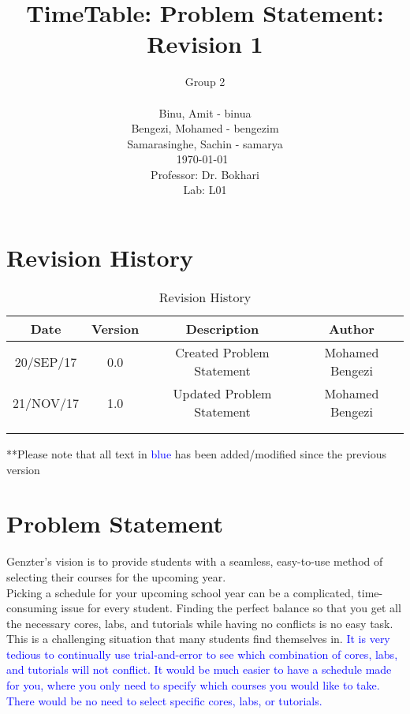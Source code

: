 \documentclass[12pt]{article}
\title{TimeTable: Problem Statement: Revision 1}
\author{Group 2 \\
		\\ Binu, Amit - binua
		\\ Bengezi, Mohamed - bengezim
		\\ Samarasinghe, Sachin - samarya
		\\ \today\
		\\Professor: Dr. Bokhari
		\\ Lab: L01}
\date{}
\begin{document}
\maketitle
\newpage
\tableofcontents

\newpage

\section{Revision History}
\begin{table}[h]
\begin{center}
\begin{tabular}{ | c | c | c | c | }
\hline
 Date & Version & Description & Author \\ 
\hline
 20/SEP/17 & 0.0 & Created Problem Statement & Mohamed Bengezi \\  
\hline
 21/NOV/17 & 1.0 & Updated Problem Statement & Mohamed Bengezi \\
\hline
 & & & \\
\hline 
 & & & \\ 
\hline 
\end{tabular}
\end{center}
\caption{Revision History}
\end{table}

**Please note that all text in  \textcolor{blue}{blue} has been added/modified since the previous version

\newpage
\section{Problem Statement}
Genzter’s vision is to provide students with a seamless, easy-to-use method of selecting their courses for the upcoming year.\\
 
Picking a schedule for your upcoming school year can be a complicated, time-consuming issue for every student. Finding the perfect balance so that you get all the necessary cores, labs, and tutorials while having no conflicts is no easy task. This is a challenging situation that many students find themselves in. \textcolor{blue}{It is very tedious to continually use trial-and-error to see which combination of cores, labs, and tutorials will not conflict. It would be much easier to have a schedule made for you, where you only need to specify which courses you would like to take. There would be no need to select specific cores, labs, or tutorials.}\\
\end{document}

